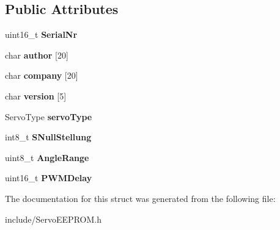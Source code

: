 \subsection*{Public Attributes}
\begin{DoxyCompactItemize}
\item 
\mbox{\label{struct_e_e_p_r_o_m__init_values_abdb7cb2ec8ad9f880b60859dd96e9715}} 
uint16\+\_\+t {\bfseries Serial\+Nr}
\item 
\mbox{\label{struct_e_e_p_r_o_m__init_values_ade2f7625e2b736608b3ef57c135f95ba}} 
char {\bfseries author} \mbox{[}20\mbox{]}
\item 
\mbox{\label{struct_e_e_p_r_o_m__init_values_a6da00469d601a55300bf6b3c0ecf0cea}} 
char {\bfseries company} \mbox{[}20\mbox{]}
\item 
\mbox{\label{struct_e_e_p_r_o_m__init_values_a1f5a8dd62c0be3b35b9d701a0f079be1}} 
char {\bfseries version} \mbox{[}5\mbox{]}
\item 
\mbox{\label{struct_e_e_p_r_o_m__init_values_aefc467aa4226b50293b47ab5162e4eec}} 
Servo\+Type {\bfseries servo\+Type}
\item 
\mbox{\label{struct_e_e_p_r_o_m__init_values_ae168c3bc4f15965045850806a10de2dc}} 
int8\+\_\+t {\bfseries S\+Null\+Stellung}
\item 
\mbox{\label{struct_e_e_p_r_o_m__init_values_a18362f0cc2246a7136cc502009f5865d}} 
uint8\+\_\+t {\bfseries Angle\+Range}
\item 
\mbox{\label{struct_e_e_p_r_o_m__init_values_a454c599b128bb090d874bcaa2844ca93}} 
uint16\+\_\+t {\bfseries P\+W\+M\+Delay}
\end{DoxyCompactItemize}


The documentation for this struct was generated from the following file\+:\begin{DoxyCompactItemize}
\item 
include/Servo\+E\+E\+P\+R\+O\+M.\+h\end{DoxyCompactItemize}
